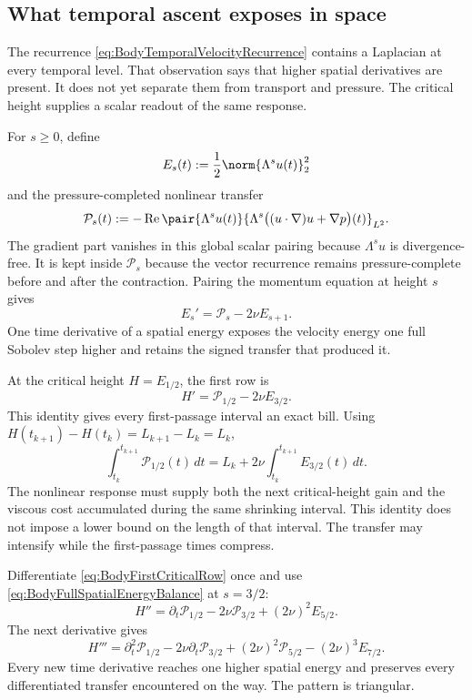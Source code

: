 \subsection{What temporal ascent exposes in space}\label{sub:TheViscosityDrivenSpatialAscent}

The recurrence \eqref{eq:BodyTemporalVelocityRecurrence} contains a Laplacian at every temporal level.
That observation says that higher spatial derivatives are present.
It does not yet separate them from transport and pressure.
The critical height supplies a scalar readout of the same response.

For \(s\geq0\), define
\[
  E_s(t):=\frac12\norm{\Lambda^su(t)}_2^2
\]
and the pressure-completed nonlinear transfer
\[
  \mathcal P_s(t)
  :=-
  \operatorname{Re}
  \pair{\Lambda^su(t)}
  {\Lambda^s\bigl((u\cdot\nabla)u+\nabla p\bigr)(t)}_{L^2}.
\]
The gradient part vanishes in this global scalar pairing because \(\Lambda^su\) is divergence-free.
It is kept inside \(\mathcal P_s\) because the vector recurrence remains pressure-complete before and after the contraction.
Pairing the momentum equation at height \(s\) gives
\begin{equation}\label{eq:BodyFullSpatialEnergyBalance}
  E_s'=\mathcal P_s-2\nu E_{s+1}.
\end{equation}
One time derivative of a spatial energy exposes the velocity energy one full Sobolev step higher and retains the signed transfer that produced it.

At the critical height \(H=E_{1/2}\), the first row is
\begin{equation}\label{eq:BodyFirstCriticalRow}
  H'=\mathcal P_{1/2}-2\nu E_{3/2}.
\end{equation}
This identity gives every first-passage interval an exact bill.
Using \(H(t_{k+1})-H(t_k)=L_{k+1}-L_k=L_k\),
\begin{equation}\label{eq:EachZenoPassageCost}
  \int_{t_k}^{t_{k+1}}\mathcal P_{1/2}(t)\,dt
  =L_k+2\nu\int_{t_k}^{t_{k+1}}E_{3/2}(t)\,dt.
\end{equation}
The nonlinear response must supply both the next critical-height gain and the viscous cost accumulated during the same shrinking interval.
This identity does not impose a lower bound on the length of that interval.
The transfer may intensify while the first-passage times compress.

Differentiate \eqref{eq:BodyFirstCriticalRow} once and use \eqref{eq:BodyFullSpatialEnergyBalance} at \(s=3/2\):
\begin{equation}\label{eq:BodySecondCriticalRow}
  H''
  =\partial_t\mathcal P_{1/2}
  -2\nu\mathcal P_{3/2}
  +(2\nu)^2E_{5/2}.
\end{equation}
The next derivative gives
\begin{equation}\label{eq:BodyThirdCriticalRow}
  H'''
  =\partial_t^2\mathcal P_{1/2}
  -2\nu\partial_t\mathcal P_{3/2}
  +(2\nu)^2\mathcal P_{5/2}
  -(2\nu)^3E_{7/2}.
\end{equation}
Every new time derivative reaches one higher spatial energy and preserves every differentiated transfer encountered on the way.
The pattern is triangular.

